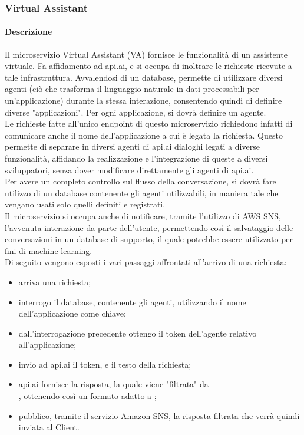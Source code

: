 \subsubsection{Virtual Assistant}
\paragraph{Descrizione}
Il microservizio Virtual Assistant (VA) fornisce le funzionalità di un assistente virtuale. Fa affidamento ad api.ai, e si occupa di inoltrare le richieste ricevute a tale infrastruttura. Avvalendosi di un database, permette di utilizzare diversi agenti (ciò che trasforma il linguaggio naturale in dati processabili per un'applicazione) durante la stessa interazione, consentendo quindi di definire diverse "applicazioni". Per ogni applicazione, si dovrà definire un agente.\\ Le richieste fatte all'unico endpoint di questo microservizio richiedono infatti di comunicare anche il nome dell'applicazione a cui è legata la richiesta. Questo permette di separare in diversi agenti di api.ai dialoghi legati a diverse funzionalità, affidando la realizzazione e l'integrazione di queste a diversi sviluppatori, senza dover modificare direttamente gli agenti di api.ai. \\
Per avere un completo controllo sul flusso della conversazione, si dovrà fare utilizzo di un database contenente gli agenti utilizzabili, in maniera tale che vengano usati solo quelli definiti e registrati.\\
Il microservizio si occupa anche di notificare, tramite l'utilizzo di AWS SNS, l'avvenuta interazione da parte dell'utente, permettendo così il salvataggio delle conversazioni in un database di supporto, il quale potrebbe essere utilizzato per fini di machine learning.\\
Di seguito vengono esposti i vari passaggi affrontati all'arrivo di una richiesta:
\begin{itemize}
	\item arriva una richiesta;
	\item interrogo il database, contenente gli agenti, utilizzando il nome dell'applicazione come chiave;
	\item dall'interrogazione precedente ottengo il token dell'agente relativo all'applicazione;
	\item invio ad api.ai il token, e il testo della richiesta;
	\item api.ai fornisce la risposta, la quale viene "filtrata" da\\ , ottenendo così un formato adatto a ;
	\item pubblico, tramite il servizio Amazon SNS, la risposta filtrata che verrà quindi inviata al Client.
\end{itemize}
